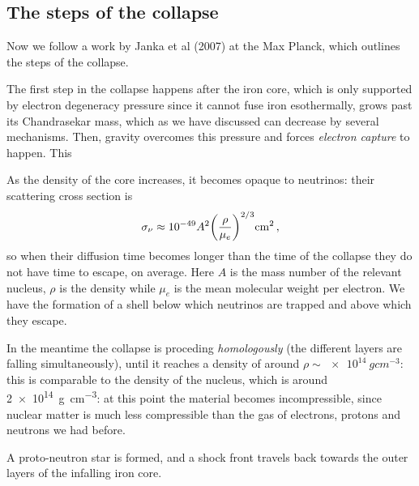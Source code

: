 \documentclass[main.tex]{subfiles}
\begin{document}

\subsection{The steps of the collapse}

Now we follow a work by Janka et al (2007) at the Max Planck, which outlines the steps of the collapse. 

The first step in the collapse happens after the iron core, which is only supported by electron degeneracy pressure since it cannot fuse iron esothermally, grows past its Chandrasekar mass, which as we have discussed can decrease by several mechanisms. Then, gravity overcomes this pressure and forces \emph{electron capture} to happen. This 

As the density of the core increases, it becomes opaque to neutrinos: their scattering cross section is
%
\begin{align}
  \sigma_{\nu } \approx \num{e-49} A^2 \qty(\frac{\rho }{\mu_{e}})^{2/3} \SI{}{cm^2}
\,,
\end{align}
%
so when their diffusion time becomes longer than the time of the collapse they do not have time to escape, on average.
Here \(A\) is the mass number of the relevant nucleus, \(\rho \) is the density while \(\mu_{e}\) is the mean molecular weight per electron.
We have the formation of a shell below which neutrinos are trapped and above which they escape.


In the meantime the collapse is proceding \emph{homologously} (the different layers are falling simultaneously), until it reaches a density of around \(\rho \sim \SI{e14}{g cm^{-3}}\): this is comparable to the density of the nucleus, which is around \SI{2e14}{g cm^{-3}}: at this point the material becomes incompressible, since nuclear matter is much less compressible than the gas of electrons, protons and neutrons we had before.

A proto-neutron star is formed, and a shock front travels back towards the outer layers of the infalling iron core. 
\end{document}
